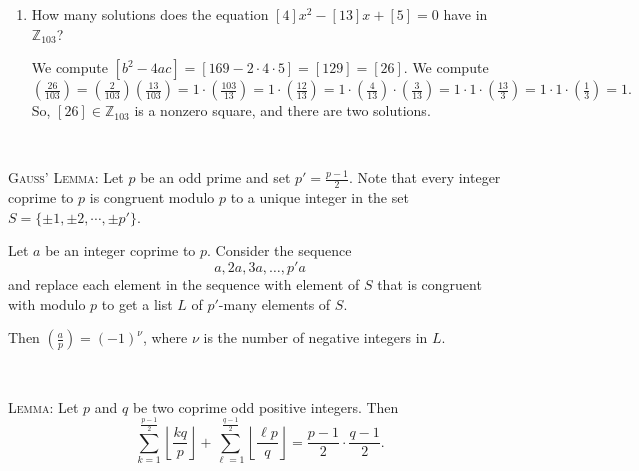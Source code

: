 \documentclass[12pt]{amsart}
\newcommand{\Z}{\mathbb{Z}}
\newcommand{\solution}[1]{\ifthenelse {\equal{\displaysol}{1}} {\begin{framed}{\color{meretale}\noindent #1}\end{framed}} { \ }}
\begin{document}
\begin{enumerate}
\solution{
\begin{enumerate}
\item $\left( \frac{10}{13}\right)=\left( \frac{2}{13}\right) \left( \frac{5}{13}\right) = -1 \cdot \left( \frac{13}{5}\right) = -1 \cdot \left( \frac{3}{5}\right) = -1 \cdot \left( \frac{5}{3}\right)  = -1 \cdot \left( \frac{2}{3}\right) = -1 \cdot -1 =1$.
\item$\left( \frac{38}{127}\right) = \left( \frac{2}{127}\right) \left( \frac{19}{127}\right) = 1 \cdot -1 \cdot \left( \frac{127}{19}\right) = 1 \cdot -1 \cdot \left( \frac{127}{19}\right) = 1 \cdot -1 \cdot \left( \frac{13}{19}\right) = 1 \cdot -1 \cdot \left( \frac{19}{13}\right) = 1 \cdot -1 \cdot \left( \frac{5}{13}\right) = 1 \cdot -1 \cdot \left( \frac{13}{5}\right) = 1 \cdot -1 \cdot \left( \frac{3}{5}\right) = 1 \cdot -1 \cdot -1 = 1$.
\end{enumerate}
}

\item How many solutions does the equation $[4]x^2 - [13] x + [5] = 0$ have in $\Z_{103}$?

\solution{ We compute $[b^2 - 4ac] = [169 - 2 \cdot 4  \cdot 5] = [129] = [26]$. We compute $\left( \frac{26}{103} \right) = \left( \frac{2}{103} \right) \left( \frac{13}{103} \right) = 1\cdot  \left( \frac{103}{13} \right) = 1\cdot  \left( \frac{12}{13} \right) = 1 \cdot  \left( \frac{4}{13} \right) \cdot  \left( \frac{3}{13} \right) = 1 \cdot 1 \cdot  \left( \frac{13}{3} \right)  = 1 \cdot 1 \cdot  \left( \frac{1}{3} \right)  = 1.$
 So, $[26]\in \Z_{103}$ is a nonzero square, and there are two solutions.}


\end{enumerate}




\begin{framed}
\noindent \textsc{Gauss' Lemma:} Let $p$ be an odd prime and set $p' = \frac{p-1}{2}$. Note that every integer coprime to $p$ is congruent modulo $p$ to a unique integer  in the set $S= \{\pm1, \pm 2,\cdots, \pm p'\}$.

 Let $a$ be an integer coprime to $p$. Consider the sequence
\[ a, 2a, 3a, \dots, p'a \] and replace each element in the sequence with element of $S$ that is congruent with modulo $p$ to get a list $L$ of $p'$-many elements of $S$.

Then $\displaystyle \left( \frac{a}{p} \right) = (-1)^\nu$, where $\nu$ is the number of negative integers in $L$.

\

\noindent \textsc{Lemma:} Let $p$ and $q$ be two coprime odd positive integers. Then 
\[ \sum_{k=1}^{\frac{p-1}{2}} \left \lfloor \frac{kq}{p} \right\rfloor + \sum_{\ell=1}^{\frac{q-1}{2}} \left \lfloor \frac{\ell p}{q} \right\rfloor = \frac{p-1}{2} \cdot \frac{q-1}{2}.\]
\end{framed}
\end{document}
